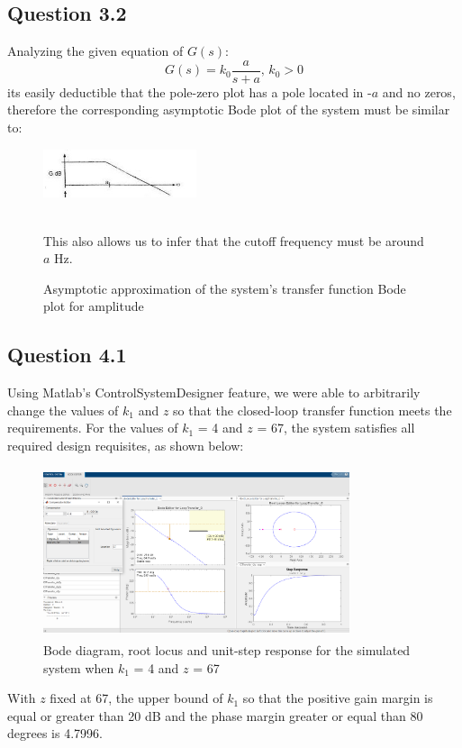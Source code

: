 \documentclass[a4paper,8pt]{extarticle}
\begin{document}
        \subsection*{Question 3.2}
           Analyzing the given equation of $G(s)$:\\
           \begin{equation}
               G(s)=k_0 \frac{a}{s+a}\text{, } k_0 > 0
           \end{equation}
            its easily deductible that the pole-zero plot has a pole located in -$a$ and no zeros, therefore the corresponding asymptotic Bode plot of the system must be similar to:\\
            \begin{figure}[H]
            \centering
            \captionsetup{justification=centering,margin=2cm}
            \includegraphics[width=0.4\textwidth]{asym_bode.jpg} 
            \caption{Asymptotic approximation of the system's transfer function Bode plot for amplitude}
            \\ This also allows us to infer that the cutoff frequency must be around $a$ Hz.
        \end{figure}
        \subsection*{Question 4.1}
        Using Matlab's ControlSystemDesigner feature, we were able to arbitrarily change the values of $k_{1}$ and $z$ so that the closed-loop transfer function meets the requirements. For the values of $k_{1}$ = 4 and $z$ = 67, the system satisfies all required design requisites, as shown below:
        \begin{figure}[H]
            \centering
            \captionsetup{justification=centering,margin=2cm}
            \includegraphics[width=9cm,height=5cm]{Screenshot (344).png} 
            \caption{Bode diagram, root locus and unit-step response for the simulated system when $k_{1}$ = 4 and $z$ = 67}
        \end{figure}
        With $z$ fixed at 67, the upper bound of $k_{1}$ so that the positive gain margin is equal or greater than 20 dB and the phase margin greater or equal than 80 degrees is 4.7996. 
\end{document}
